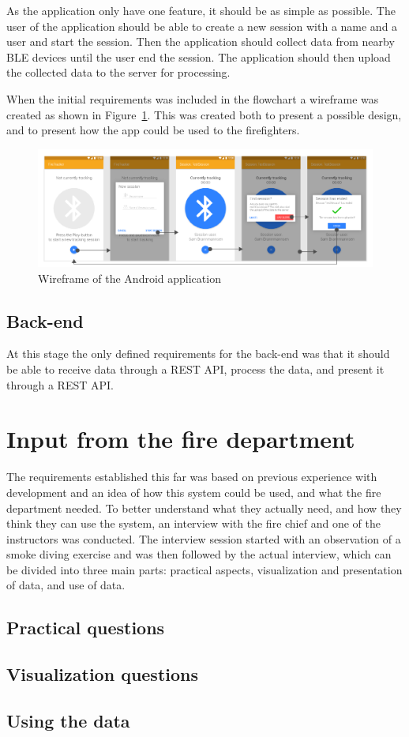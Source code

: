 \documentclass[../Main/thesis.tex]{subfiles}
\begin{document}
As the application only have one feature, it should be as simple as possible. 
The user of the application should be able to create a new session with a name and a user and start the session. 
Then the application should collect data from nearby BLE devices until the user end the session.
The application should then upload the collected data to the server for processing.

When the initial requirements was included in the flowchart a wireframe was created as shown in Figure~\ref{fig:wireframe-app-1}.
This was created both to present a possible design, and to present how the app could be used to the firefighters. 

\begin{figure}
	\centering
	\includegraphics[width=\linewidth]{../fig/wireframe_app_1}
	\caption{Wireframe of the Android application}
	\label{fig:wireframe-app-1}
\end{figure}

\subsection{Back-end}
At this stage the only defined requirements for the back-end was that it should be able to receive data through a REST API, process the data, and present it through a REST API.

\section{Input from the fire department}
The requirements established this far was based on previous experience with development and an idea of how this system could be used, and what the fire department needed.
To better understand what they actually need, and how they think they can use the system, an interview with the fire chief and one of the instructors was conducted.
The interview session started with an observation of a smoke diving exercise and was then followed by the actual interview, which can be divided into three main parts: practical aspects, visualization and presentation of data, and use of data.

\subsection{Practical questions}

\subsection{Visualization questions}

\subsection{Using the data}
\end{document}
